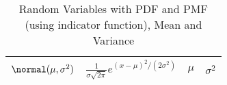 {\begin{table}[ht]
\begin{tabular}{|c|c|c|c|}
$\normal(\mu,\sigma^2)$&$\frac{1}{\sigma\sqrt{2\pi}}e^{(x-\mu)^2/(2\sigma^2)}$&$\mu$&$\sigma^2$\\%
\hline
\end{tabular}
\caption{Random Variables with PDF and PMF (using indicator function), Mean and Variance}
\end{table}

}
